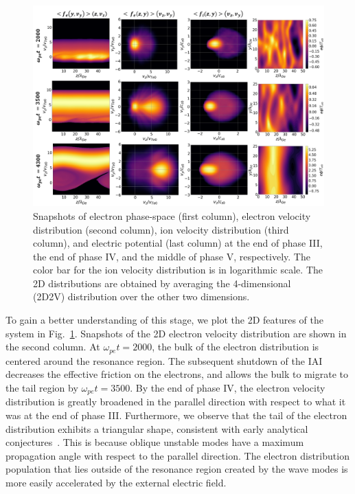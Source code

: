 \documentclass[%
 reprint,
 amsmath,
 amssymb,
 aps,
 prx,
floatfix,
superscriptaddress
]{revtex4-2}
\begin{document}
\begin{figure}[htbp!]
\includegraphics[width=1.0\textwidth]{Fig5.pdf}%
\caption{\label{fig:5.2d} Snapshots of electron phase-space (first column), electron velocity distribution (second column), ion velocity distribution  (third column), and electric potential (last column) at the end of phase III, the end of phase IV, and the middle of phase V, respectively. The color bar for the ion velocity distribution is in logarithmic scale. The 2D distributions are obtained by averaging the 4-dimensional (2D2V) distribution over the other two dimensions. }
\end{figure}

To gain a better understanding of this stage, we plot the 2D features of the system in Fig.~\ref{fig:5.2d}. 
Snapshots of the 2D electron velocity distribution are shown in the second column. 
At $\omega_{pe} t = 2000$, the bulk of the electron distribution is centered around the resonance region.
The subsequent shutdown of the IAI decreases the effective friction on the electrons, and allows the bulk to migrate to the tail region by $\omega_{pe} t = 3500$.
By the end of phase IV, the electron velocity distribution is greatly broadened in the parallel direction with respect to what it was at the end of phase III. 
Furthermore, we observe that the tail of the electron distribution exhibits a triangular shape, consistent with early analytical conjectures~\cite{sagdeev1969nonlinear}.
This is because oblique unstable modes have a maximum propagation angle with respect to the parallel direction. The electron distribution population that lies outside of the resonance region created by the wave modes is more easily accelerated by the external electric field.
\end{document}

